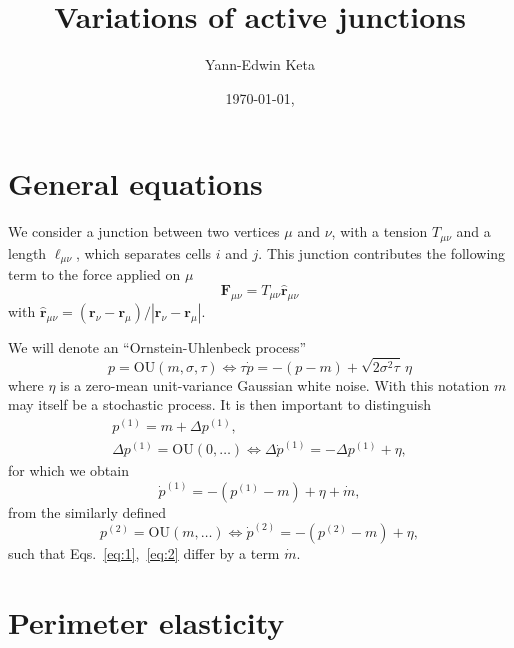 \documentclass[aps, superscriptaddress, notitlepage, longbibliography]{revtex4-1}
\begin{document}
\title{Variations of active junctions}
\author{Yann-Edwin Keta}
\date{\today, \currenttime}                                                     
\maketitle

\section{General equations}

We consider a junction between two vertices $\mu$ and $\nu$, with a tension $T_{\mu\nu}$ and a length $\ell_{\mu\nu}$, which separates cells $i$ and $j$. This junction contributes the following term to the force applied on $\mu$
\begin{equation}
\boldsymbol{F}_{\mu\nu} = T_{\mu\nu} \hat{\boldsymbol{r}}_{\mu\nu}
\end{equation}
with $\hat{\boldsymbol{r}}_{\mu\nu} = (\boldsymbol{r}_{\nu} - \boldsymbol{r}_{\mu})/|\boldsymbol{r}_{\nu} - \boldsymbol{r}_{\mu}|$.

We will denote an ``Ornstein-Uhlenbeck process''
\begin{equation}
p = \mathrm{OU}(m, \sigma, \tau) \Leftrightarrow \tau \dot{p} = -(p - m) + \sqrt{2 \sigma^2 \tau} \, \eta
\end{equation}
where $\eta$ is a zero-mean unit-variance Gaussian white noise. With this notation $m$ may itself be a stochastic process. It is then important to distinguish
\begin{subequations}
\begin{align}
p^{(1)} = m + \Delta p^{(1)},\\
\Delta p^{(1)} = \mathrm{OU}(0, \ldots) \Leftrightarrow \Delta \dot{p}^{(1)} = - \Delta p^{(1)} + \eta,
\end{align}
\end{subequations}
for which we obtain
\begin{equation}
\dot{p}^{(1)} = -(p^{(1)} - m) + \eta + \dot{m},
\label{eq:1}
\end{equation}
from the similarly defined
\begin{equation}
p^{(2)} = \mathrm{OU}(m, \ldots) \Leftrightarrow \dot{p}^{(2)} = -(p^{(2)} - m) + \eta,
\label{eq:2}
\end{equation}
such that Eqs.~\ref{eq:1},~\ref{eq:2} differ by a term $\dot{m}$.

\section{Perimeter elasticity}
\end{document}
